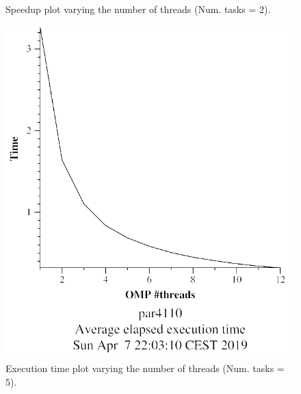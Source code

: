 \documentclass[12pt, a4paper]{article}
\begin{document}
\begin{figure}[H]
\begin{minipage}[b]{0.4\linewidth}
  \caption{Speedup plot varying the number of threads (Num. tasks = 2).}
  \label{fig:mandel-omp-10000-strong-omp-24-2-speedup}
\end{minipage}
\end{figure}

\begin{figure}[H]
\centering
\begin{minipage}[b]{0.4\linewidth}
  \centering
  \includegraphics[scale=0.5]{./mandel-omp-10000-strong-omp-24-5-time}
  \caption{Execution time plot varying the number of threads (Num. tasks = 5).}
  \label{fig:mandel-omp-10000-strong-omp-24-5-time}
\end{minipage}%
\hspace{0.5cm}
\begin{minipage}[b]{0.4\linewidth}
  \centering

\end{minipage}
\end{figure}
\end{document}
